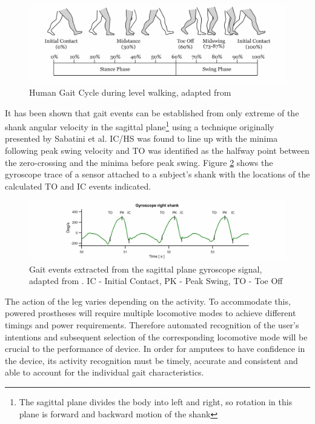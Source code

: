 \documentclass[sensors,article,submit,moreauthors,pdftex]{Definitions/mdpi}
\begin{document}
\begin{figure}[!htb]
    \centering
    \includegraphics[width=\textwidth]{Figures/Gait_Cycle.jpg}
    \caption{Human Gait Cycle during level walking, adapted from \cite{humanGaitCycle2016}}
    \label{fig:gait_cycle}
\end{figure}

It has been shown that gait events can be established from only extreme of the shank angular velocity in the sagittal plane\footnote{The sagittal plane divides the body into left and right, so rotation in this plane is forward and backward motion of the shank}  using a technique originally presented by Sabatini et al\cite{Sabatini2005}. IC/HS was found to line up with the minima following peak swing velocity and TO was identified as the halfway point between the zero-crossing and the minima before peak swing. Figure \ref{fig:y-gyro-hs-to} shows the gyroscope trace of a sensor attached to a subject's shank with the locations of the calculated TO and IC events indicated.

\begin{figure}[!htb]
    \centering
    \includegraphics[width=\textwidth]{Figures/gyro_trace_hs.jpg}
    \caption{Gait events extracted from the sagittal plane gyroscope signal, adapted from \cite{Sabatini2005}. IC - Initial Contact, PK - Peak Swing, TO - Toe Off}
    \label{fig:y-gyro-hs-to}
\end{figure}

The action of the leg varies depending on the activity. To accommodate this, powered prostheses will require multiple locomotive modes to achieve different timings and power requirements. Therefore automated recognition of the user's intentions and subsequent selection of the corresponding locomotive mode will be crucial to the performance of device\cite{Tucker2015, Windrich2016, Zhang2015}. In order for amputees to have confidence in the device, its activity recognition must be timely, accurate and consistent and able to account for the individual gait characteristics.\cite{Pedroli2019, Sinha2011, Ponce2016}
\end{document}
